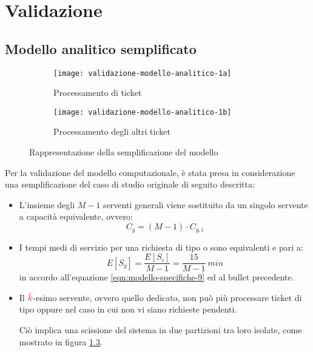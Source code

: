 \chapter{Validazione}\label{chp:validazione}
\section{Modello analitico semplificato}
\begin{figure}[ht]
\centering
\begin{subfigure}[b]{0.475\textwidth}
\centering
\texttt{[image: validazione-modello-analitico-1a]}
\caption{Processamento di ticket \sr{}}    
\label{fig:validazione-modello-analitico-1a}
\end{subfigure}
\hfill 
\begin{subfigure}[b]{0.475\textwidth}  
\centering 
\texttt{[image: validazione-modello-analitico-1b]}
\caption{Processamento degli altri ticket}    
\label{fig:validazione-modello-analitico-1b}
\end{subfigure}
\caption{Rappresentazione della semplificazione del modello}
\label{fig:validazione-modello-analitico-1}
\end{figure}

Per la validazione del modello computazionale, è stata presa in considerazione una semplificazione del caso di studio originale di seguito descritta:
\begin{itemize}
\item L'insieme degli $M-1$ serventi generali viene sostituito da un singolo servente a capacità equivalente, ovvero:
\begin{equation}
C_g = (M-1)\cdot C_{g,i}
\end{equation}
\item I tempi medi di servizio per una richiesta di tipo \uo{} o \pp{} sono equivalenti e pari a:
\begin{equation}
E[S_g] = \frac{E[S_i]}{M-1} = \frac{15}{M-1}\ min
\end{equation} 
in accordo all'equazione \ref{eqn:modello-specifiche-9} ed al bullet precedente.
\item Il ${\color{red}\hat{k}}{}$-esimo servente, ovvero quello dedicato, non può più processare ticket di tipo \uo{} oppure \pp{} nel caso in cui non vi siano richieste \sr{} pendenti.

Ciò implica una scissione del sistema in due partizioni tra loro isolate, come mostrato in figura \ref{fig:validazione-modello-analitico-1}.
\end{itemize}

